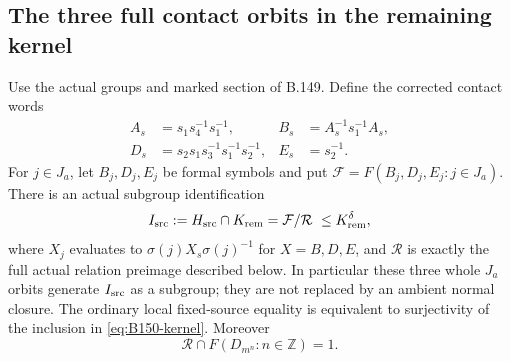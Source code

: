 \subsection*{The three full contact orbits in the remaining kernel}
\label{stmt:B150}
Use the actual groups and marked section of B.149. Define the corrected
contact words
\begin{equation}\label{eq:B150-contact}
\begin{aligned}
 A_s&=s_1s_4^{-1}s_1^{-1},&
 B_s&=A_s^{-1}s_1^{-1}A_s,\\
 D_s&=s_2s_1s_3^{-1}s_1^{-1}s_2^{-1},&
 E_s&=s_2^{-1}.
\end{aligned}
\end{equation}
For $j\in J_a$, let $B_j,D_j,E_j$ be formal symbols and put
$\mathcal F=F(B_j,D_j,E_j:j\in J_a)$. There is an actual subgroup
identification
\begin{equation}\label{eq:B150-kernel}
 I_{\rm src}:=H_{\rm src}\cap K_{\rm rem}
       =\mathcal F/\mathcal R\ \le K_{\rm rem}^{\delta},
\end{equation}
where $X_j$ evaluates to $\sigma(j)X_s\sigma(j)^{-1}$ for
$X=B,D,E$, and $\mathcal R$ is exactly the full actual relation
preimage described below. In particular these three whole $J_a$
orbits generate $I_{\rm src}$ as a subgroup; they are not replaced
by an ambient normal closure. The ordinary local fixed-source equality
is equivalent to surjectivity of the inclusion in
\eqref{eq:B150-kernel}. Moreover
\[
 \mathcal R\cap F(D_{m^n}:n\in\mathbb Z)=1.
\]
